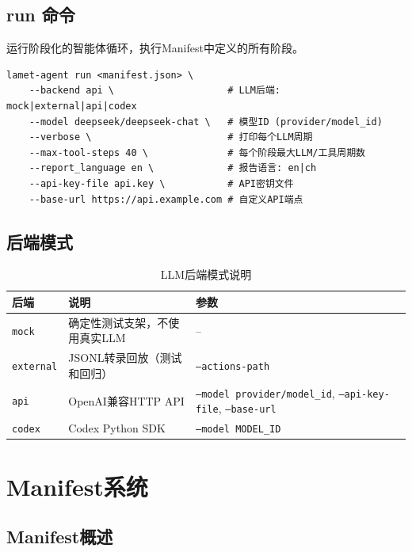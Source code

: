 \documentclass[12pt,a4paper]{ctexart}
\begin{document}
\subsection{run 命令}

运行阶段化的智能体循环，执行Manifest中定义的所有阶段。

\begin{lstlisting}[caption={run 命令完整参数}]
lamet-agent run <manifest.json> \
    --backend api \                    # LLM后端: mock|external|api|codex
    --model deepseek/deepseek-chat \   # 模型ID (provider/model_id)
    --verbose \                        # 打印每个LLM周期
    --max-tool-steps 40 \              # 每个阶段最大LLM/工具周期数
    --report_language en \             # 报告语言: en|ch
    --api-key-file api.key \           # API密钥文件
    --base-url https://api.example.com # 自定义API端点
\end{lstlisting}

\subsection{后端模式}

\begin{table}[H]
\centering
\caption{LLM后端模式说明}
\label{tab:backends}
\begin{tabular}{@{}llp{6cm}@{}}
\toprule
\textbf{后端} & \textbf{说明} & \textbf{参数} \\
\midrule
\texttt{mock} & 确定性测试支架，不使用真实LLM & -- \\
\texttt{external} & JSONL转录回放（测试和回归） & \texttt{--actions-path} \\
\texttt{api} & OpenAI兼容HTTP API & \texttt{--model provider/model\_id}, \texttt{--api-key-file}, \texttt{--base-url} \\
\texttt{codex} & Codex Python SDK & \texttt{--model MODEL\_ID} \\
\bottomrule
\end{tabular}
\end{table}

\section{Manifest系统}

\subsection{Manifest概述}
\end{document}
